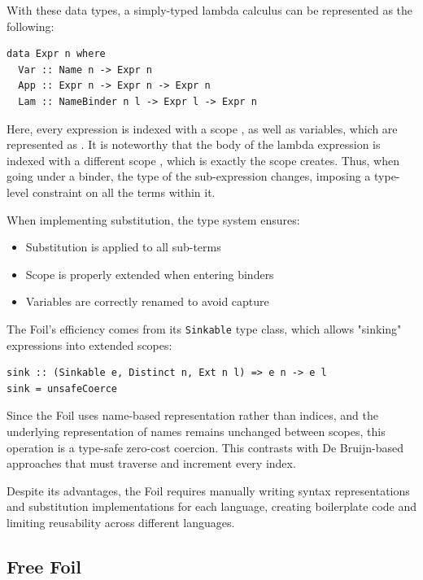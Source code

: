 With these data types, a simply-typed lambda calculus can be represented as the following:
\begin{verbatim}
data Expr n where
  Var :: Name n -> Expr n
  App :: Expr n -> Expr n -> Expr n
  Lam :: NameBinder n l -> Expr l -> Expr n
\end{verbatim}

Here, every expression is indexed with a scope , as well as variables, which are represented as . It is noteworthy that the body of the lambda expression is indexed with a different scope , which is exactly the scope  creates. Thus, when going under a binder, the type of the sub-expression changes, imposing a type-level constraint on all the terms within it.

When implementing substitution, the type system ensures:

\begin{itemize}
    \item Substitution is applied to all sub-terms
    \item Scope is properly extended when entering binders
    \item Variables are correctly renamed to avoid capture
\end{itemize}

The Foil's efficiency comes from its \texttt{Sinkable} type class, which allows "sinking" expressions into extended scopes:

\begin{verbatim}
sink :: (Sinkable e, Distinct n, Ext n l) => e n -> e l
sink = unsafeCoerce
\end{verbatim}

Since the Foil uses name-based representation rather than indices, and the underlying representation of names remains unchanged between scopes, this operation is a type-safe zero-cost coercion. This contrasts with De Bruijn-based approaches that must traverse and increment every index.

Despite its advantages, the Foil requires manually writing syntax representations and substitution implementations for each language, creating boilerplate code and limiting reusability across different languages.

\subsection{Free Foil}

